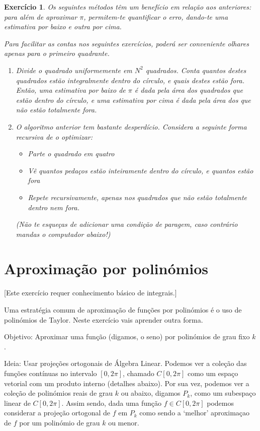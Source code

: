 \documentclass{article}
\newtheorem{ex}{Exercício}[section]
\begin{document}
\begin{ex}
Os seguintes métodos têm um benefício em relação aos anteriores: para além de aproximar $\pi$, permitem-te quantificar o erro, dando-te uma estimativa por baixo e outra por cima.

Para facilitar as contas nos seguintes exercícios, poderá ser conveniente olhares apenas para o primeiro quadrante.

\begin{enumerate}
\item Divide o quadrado uniformemente em $N^2$ quadrados. Conta quantos destes quadrados estão integralmente dentro do círculo, e quais destes estão fora. Então, uma estimativa por baixo de $\pi$ é dada pela área dos quadrados que estão dentro do círculo, e uma estimativa por cima é dada pela área dos que não estão totalmente fora.

\item O algoritmo anterior tem bastante desperdício. Considera a seguinte forma recursiva de o optimizar:
\begin{itemize}
\item Parte o quadrado em quatro
\item Vê quantos pedaços estão inteiramente dentro do círculo, e quantos estão fora
\item Repete recursivamente, apenas nos quadrados que não estão totalmente dentro nem fora.
\end{itemize}

(Não te esqueças de adicionar uma condição de paragem, caso contrário mandas o computador abaixo!)
\end{enumerate}
\end{ex}

\section{Aproximação por polinómios}

[Este exercício requer conhecimento básico de integrais.]

Uma estratégia comum de aproximação de funções por polinómios é o uso de polinómios de Taylor. Neste exercício vais aprender outra forma.

Objetivo: Aproximar uma função (digamos, o seno) por polinómios de grau fixo $k$.

Ideia: Usar projeções ortogonais de Álgebra Linear. Podemos ver a coleção das funções contínuas no intervalo $[0,2\pi]$, chamado $C[0,2\pi]$ como um espaço vetorial com um produto interno (detalhes abaixo). Por sua vez, podemos ver a coleção de polinómios reais de grau $k$ ou abaixo, digamos $P_k$, como um subespaço linear de $C[0,2\pi]$. Assim sendo, dada uma função $f \in C[0,2\pi]$ podemos considerar a projeção ortogonal de $f$ em $P_k$ como sendo a `melhor' aproximaçao de $f$ por um polinómio de grau $k$ ou menor.
\end{document}
